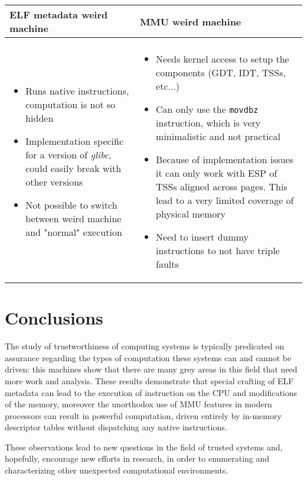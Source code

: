 \documentclass[11pt,twoside,a4paper]{article}
\begin{document}
\begin{longtable}{ p{} | p{} }
\bfseries{ELF metadata weird machine} & \bfseries{MMU weird machine} \\ \hline \\
\begin{itemize}
\item Runs native instructions, computation is not so hidden
\item Implementation specific for a version of \emph{glibc}, could easily break with other versions
\item Not possible to switch between weird machine and "normal" execution
\end{itemize}
&
\begin{itemize}
\item Needs kernel access to setup the components (GDT, IDT, TSSs, etc...)
\item Can only use the \texttt{movdbz} instruction, which is very minimalistic and not practical
\item Because of implementation issues it can only work with ESP of TSSs aligned across pages. This lead to a very limited coverage of physical memory
\item Need to insert dummy instructions to not have triple faults 
\end{itemize} \\

\end{longtable}


\section{Conclusions}

The study of trustworthiness of computing systems is typically predicated on assurance regarding the types of computation these systems can and cannot be driven: this machines show that there are many grey areas in this field that need more work and analysis.
These results demonstrate that special crafting of ELF metadata can lead to the execution of instruction on the CPU and modifications of the memory, moreover the unorthodox use of MMU features in modern processors can result in powerful computation, driven entirely by in-memory descriptor tables without dispatching any native instructions.

These observations lead to new questions in the field of trusted systems and, hopefully, encourage new efforts in research, in order to enumerating and characterizing other unexpected computational environments.
\end{document}
